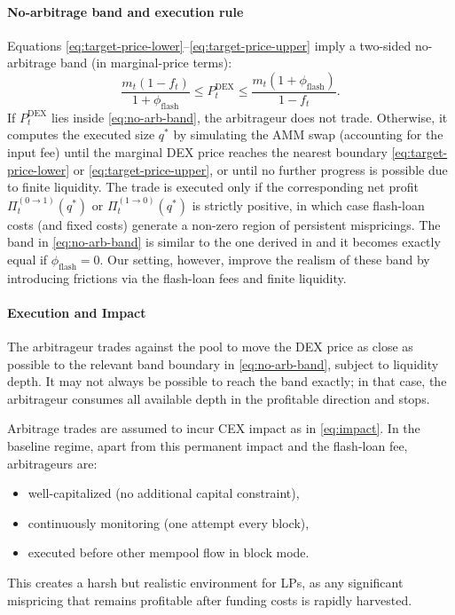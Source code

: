 \documentclass[11pt]{article}
\begin{document}
\paragraph{No-arbitrage band and execution rule}

Equations \eqref{eq:target-price-lower}--\eqref{eq:target-price-upper} imply a two-sided no-arbitrage band
(in marginal-price terms):
\begin{equation}
  \frac{m_t(1-f_t)}{1+\phi_{\mathrm{flash}}}
  \le
  P_t^{\mathrm{DEX}}
  \le
  \frac{m_t(1+\phi_{\mathrm{flash}})}{1-f_t}.
  \label{eq:no-arb-band}
\end{equation}
If $P_t^{\mathrm{DEX}}$ lies inside \eqref{eq:no-arb-band}, the arbitrageur does not trade.
Otherwise, it computes the executed size $q^*$ by simulating the AMM swap (accounting for the input fee)
until the marginal DEX price reaches the nearest boundary
\eqref{eq:target-price-lower} or \eqref{eq:target-price-upper}, or until no further progress is possible
due to finite liquidity. The trade is executed only if the corresponding net profit
$\Pi_t^{(0\rightarrow 1)}(q^*)$ or $\Pi_t^{(1\rightarrow 0)}(q^*)$ is strictly positive, in which case
flash-loan costs (and fixed costs) generate a non-zero region of persistent mispricings. The band in \ref{eq:no-arb-band} is similar to the one derived in \cite{angeris2020} and it becomes exactly equal if $\phi_{\text{flash}}=0$. Our setting, however, improve the realism of these band by introducing frictions via the flash-loan fees and finite liquidity.

\paragraph{Execution and Impact}

The arbitrageur trades against the pool
to move the DEX price as close as possible to the relevant band boundary in \eqref{eq:no-arb-band},
subject to liquidity depth. It may not always be possible to reach the band exactly; in that case,
the arbitrageur consumes all available depth in the profitable direction and stops.

Arbitrage trades are assumed to incur CEX impact as in \eqref{eq:impact}. In the baseline regime,
apart from this permanent impact and the flash-loan fee, arbitrageurs are:
\begin{itemize}[leftmargin=*]
  \item well-capitalized (no additional capital constraint),
  \item continuously monitoring (one attempt every block),
  \item executed before other mempool flow in block mode.
\end{itemize}
This creates a harsh but realistic environment for LPs, as any significant mispricing that remains profitable
after funding costs is rapidly harvested.
\end{document}
